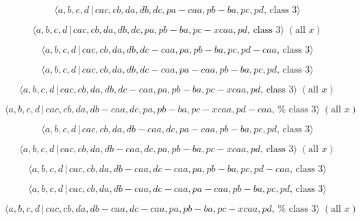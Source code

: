 \documentclass[10pt]{article}
\begin{document}
\begin{equation}
\langle a,b,c,d\,|\,cac,cb,da,db,dc,pa-caa,pb-ba,pc,pd,\,\text{class }%
3\rangle  \tag{7.3900}
\end{equation}

\begin{equation}
\langle a,b,c,d\,|\,cac,cb,da,db,dc,pa,pb-ba,pc-xcaa,pd,\,\text{class }%
3\rangle \;(\text{all }x)  \tag{7.3901}
\end{equation}

\begin{equation}
\langle a,b,c,d\,|\,cac,cb,da,db,dc-caa,pa,pb-ba,pc,pd-caa,\,\text{class }%
3\rangle  \tag{7.3902}
\end{equation}

\begin{equation}
\langle a,b,c,d\,|\,cac,cb,da,db,dc-caa,pa-caa,pb-ba,pc,pd,\,\text{class }%
3\rangle  \tag{7.3903}
\end{equation}

\begin{equation}
\langle a,b,c,d\,|\,cac,cb,da,db,dc-caa,pa,pb-ba,pc-xcaa,pd,\,\text{class }%
3\rangle \;(\text{all }x)  \tag{7.3904}
\end{equation}

\begin{equation}
\langle a,b,c,d\,|\,cac,cb,da,db-caa,dc,pa,pb-ba,pc-xcaa,pd-caa,\,\text{%
class }3\rangle \;(\text{all }x)  \tag{7.3905}
\end{equation}

\begin{equation}
\langle a,b,c,d\,|\,cac,cb,da,db-caa,dc,pa-caa,pb-ba,pc,pd,\,\text{class }%
3\rangle  \tag{7.3906}
\end{equation}

\begin{equation}
\langle a,b,c,d\,|\,cac,cb,da,db-caa,dc,pa,pb-ba,pc-xcaa,pd,\,\text{class }%
3\rangle \;(\text{all }x)  \tag{7.3907}
\end{equation}

\begin{equation}
\langle a,b,c,d\,|\,cac,cb,da,db-caa,dc-caa,pa,pb-ba,pc,pd-caa,\,\text{class 
}3\rangle  \tag{7.3908}
\end{equation}

\begin{equation}
\langle a,b,c,d\,|\,cac,cb,da,db-caa,dc-caa,pa-caa,pb-ba,pc,pd,\,\text{class 
}3\rangle  \tag{7.3909}
\end{equation}

\begin{equation}
\langle a,b,c,d\,|\,cac,cb,da,db-caa,dc-caa,pa,pb-ba,pc-xcaa,pd,\,\text{%
class }3\rangle \;(\text{all }x)  \tag{7.3910}
\end{equation}
\end{document}
